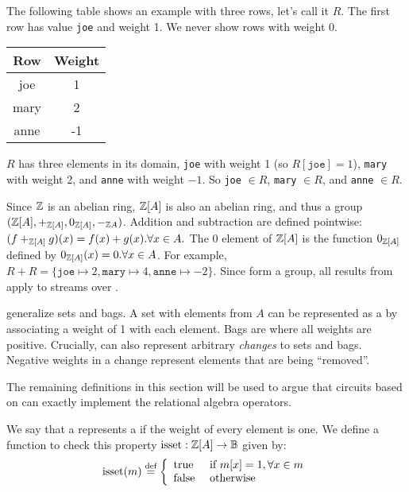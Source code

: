 The following table shows an example \zr with three rows, let's call
it $R$.  The first row has value \texttt{joe} and weight 1.  We never
show rows with weight 0.
%
\begin{center}
\begin{tabular}{|c|c|}\hline
  Row & Weight \\ \hline
  joe & 1 \\
  mary & 2 \\
  anne & -1 \\ \hline
\end{tabular}
\end{center}

$R$ has three elements in its domain, \texttt{joe} with weight 1 (so
$R[\texttt{joe}] = 1$), \texttt{mary} with weight 2, and \texttt{anne}
with weight $-1$.  So \texttt{joe} $\in R$, \texttt{mary} $\in R$,
and \texttt{anne} $\in R$.

Since $\mathbb{Z}$ is an abelian ring, $\mathbb{Z}[A]$ is also an abelian ring, and
thus a group $(\mathbb{Z}[A], +_{\mathbb{Z}[A]}, 0_{\mathbb{Z}[A]}, -_{\mathbb{Z}{A}})$.  Addition and
subtraction are defined pointwise: $(f +_{\mathbb{Z}[A]} g)(x) = f(x) + g(x)
. \forall x \in A.$ The $0$ element of $\mathbb{Z}[A]$ is the function
$0_{\mathbb{Z}[A]}$ defined by $0_{\mathbb{Z}[A]}(x) = 0 .  \forall x \in A$.  For
example, $R + R = \{ \texttt{joe} \mapsto 2, \texttt{mary} \mapsto 4,
\texttt{anne} \mapsto -2 \}$.  Since \zrs form a group, all results
from  apply to streams over \zrs.

\zrs generalize sets and bags.  A set with elements from $A$
can be represented as a \zr by associating a weight of 1 with each element.
Bags are \zrs where all weights are positive.  Crucially, \zrs
can also represent arbitrary \emph{changes} to sets and bags.
Negative weights in a change represent elements that are being ``removed''.

The remaining definitions in this section will be used to argue that
circuits based on \zrs can exactly implement the relational algebra
operators.

\begin{definition}
We say that a \zr represents a  if the weight of every
element is one.  We define a function to check this property
$\mbox{isset} : \mathbb{Z}[A] \rightarrow \mathbb{B}$
given by:
$$\mbox{isset}(m) \stackrel{\textrm{\scriptsize def}}{=} \left\{
\begin{array}{ll}
  \mbox{true} & \mbox{ if } m[x] = 1, \forall x \in m \\
  \mbox{false} & \mbox{ otherwise}
\end{array}
\right.
$$
\end{definition}

